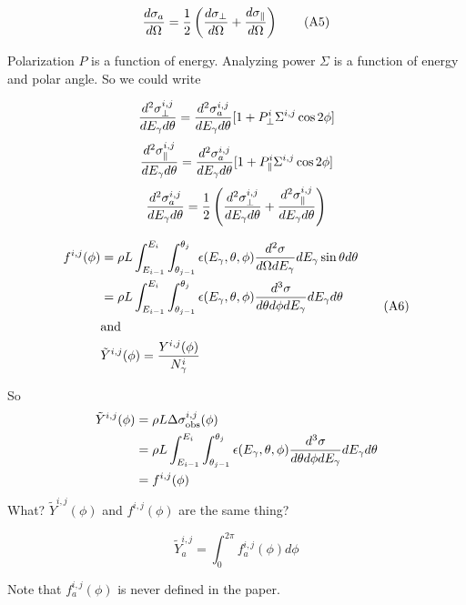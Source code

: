 \documentclass{article}
\begin{document}
\begin{equation}
{d\sigma_a \over d\Omega} = {1 \over 2} \left( {d\sigma_\perp \over d\Omega} + {d\sigma_\parallel \over d\Omega} \right) \tag{A5} \\
\end{equation}

Polarization $P$ is a function of energy. Analyzing power $\Sigma$ is a function of energy and polar angle. So we could write

\begin{equation}
{d^2\sigma^{i,j}_\perp \over dE_\gamma d\theta} = {d^2\sigma^{i,j}_a \over dE_\gamma d\theta}[1+P^i_\perp\Sigma^{i,j}\cos 2\phi] \\
\end{equation}
\begin{equation}
{d^2\sigma^{i,j}_\parallel \over dE_\gamma d\theta} = {d^2\sigma^{i,j}_a \over dE_\gamma d\theta}[1+P^i_\parallel\Sigma^{i,j}\cos 2\phi] \\
\end{equation}
\begin{equation}
  {d^2\sigma^{i,j}_a \over dE_\gamma d\theta}
  = {1 \over 2} \left( {d^2\sigma^{i,j}_\perp \over dE_\gamma d\theta}
  + {d^2\sigma^{i,j}_\parallel \over dE_\gamma d\theta} \right)
\end{equation}

\begin{equation}
  \begin{split}
f^{i,j}(\phi) & = \rho L\int^{E_i}_{E_{i-1}}\int_{\theta_{j-1}}^{\theta_j} \epsilon(E_\gamma,\theta,\phi) {d^2\sigma \over d\Omega dE_\gamma} dE_\gamma \sin\theta d\theta \\
& = \rho L\int^{E_i}_{E_{i-1}}\int_{\theta_{j-1}}^{\theta_j} \epsilon(E_\gamma,\theta,\phi) {d^3\sigma \over d\theta d\phi dE_\gamma} dE_\gamma d\theta \\
& {\rm and} \\
& \tilde Y^{i,j}(\phi) = {Y^{i,j}(\phi) \over N^i_\gamma}
\end{split} \tag{A6}
\end{equation}

So
\begin{equation}
  \begin{split}
    \tilde Y^{i,j}(\phi) & = \rho L\Delta\sigma^{i,j}_{\rm obs}(\phi) \\
    & = \rho L\int^{E_i}_{E_{i-1}}\int_{\theta_{j-1}}^{\theta_j} \epsilon(E_\gamma,\theta,\phi) {d^3\sigma \over d\theta d\phi dE_\gamma} dE_\gamma d\theta \\
    & = f^{i,j}(\phi)
  \end{split}
\end{equation}
What? $\tilde Y^{i,j}(\phi)$ and $f^{i,j}(\phi)$ are the same thing?

\begin{equation}
  \tilde Y^{i,j}_a = \int^{2\pi}_0 f^{i,j}_a(\phi)d\phi
  \tag{A7}
\end{equation}

Note that $f^{i,j}_a(\phi)$ is never defined in the paper.
\end{document}
